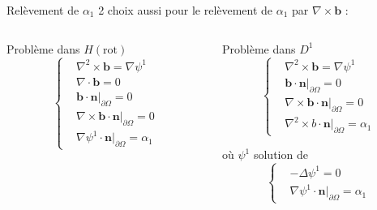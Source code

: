 \documentclass{beamer}
\newcommand{\grad}{{\nabla}}
\newcommand{\laplace}{{\Delta}}
\newcommand{\rot}{{\nabla\times}}
\newcommand{\rott}{{\nabla^2\times}}
\renewcommand{\div}{{\nabla\cdot}}
\newcommand{\restr}{{\big\rvert_{\partial\Omega}}}
\begin{document}
\begin{frame}{Relèvement de $\alpha_1$}
2 choix aussi pour le relèvement de $\alpha_1$ par $\rot\mathbf{b}$ :
\begin{columns}[t]
\begin{column}{5cm}
\begin{block}{Problème dans $ H(\mathrm{rot})$}
\[\left\{\begin{aligned}
&\rott \mathbf{b} = \grad\psi^1\\
&\div \mathbf{b} = 0\\
&\mathbf{b}\cdot \mathbf{n}\restr = 0\\
&\rot \mathbf{b}\cdot \mathbf{n}\restr = 0\\
&\grad\psi^1\cdot \mathbf{n}\restr = \alpha_1
\end{aligned}\right.\]
\end{block}
\end{column}
\begin{column}{5cm}
\begin{block}{Problème dans $D^1$}
\[\left\{\begin{aligned}
&\rott \mathbf{b} = \grad\psi^1\\
&\mathbf{b}\cdot \mathbf{n}\restr = 0\\
&\rot \mathbf{b}\cdot \mathbf{n}\restr = 0\\
&\rott b\cdot \mathbf{n}\restr = \alpha_1
\end{aligned}\right.\]
\end{block}
\begin{block}{où $\psi^1$ solution de}
\[\left\{\begin{aligned}
&-\laplace\psi^1 = 0\\
&\grad\psi^1\cdot \mathbf{n}\restr=\alpha_1
\end{aligned}\right.\]
\end{block}
\end{column}
\end{columns}
\end{frame}
\end{document}
